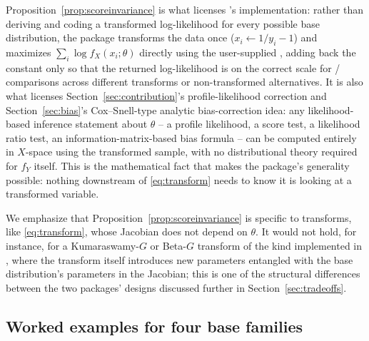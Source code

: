\documentclass[article]{jss}
\begin{document}
Proposition~\ref{prop:scoreinvariance} is what licenses 's implementation: rather than deriving and coding a transformed log-likelihood for every possible base distribution, the package transforms the data once ($x_i \leftarrow 1/y_i-1$) and maximizes $\sum_i\log f_X(x_i;\theta)$ directly using the user-supplied , adding back the constant only so that the returned log-likelihood is on the correct scale for / comparisons across different transforms or non-transformed alternatives. It is also what licenses Section~\ref{sec:contribution}'s profile-likelihood correction and Section~\ref{sec:bias}'s Cox--Snell-type analytic bias-correction idea: any likelihood-based inference statement about $\theta$ -- a profile likelihood, a score test, a likelihood ratio test, an information-matrix-based bias formula -- can be computed entirely in $X$-space using the transformed sample, with no distributional theory required for $f_Y$ itself. This is the mathematical fact that makes the package's generality possible: nothing downstream of \eqref{eq:transform} needs to know it is looking at a transformed variable.

We emphasize that Proposition~\ref{prop:scoreinvariance} is specific to transforms, like \eqref{eq:transform}, whose Jacobian does not depend on $\theta$. It would not hold, for instance, for a Kumaraswamy-$G$ or Beta-$G$ transform of the kind implemented in  \citep{nadarajah2016newdistns}, where the transform itself introduces new parameters entangled with the base distribution's parameters in the Jacobian; this is one of the structural differences between the two packages' designs discussed further in Section~\ref{sec:tradeoffs}.

\subsection{Worked examples for four base families}
\end{document}
